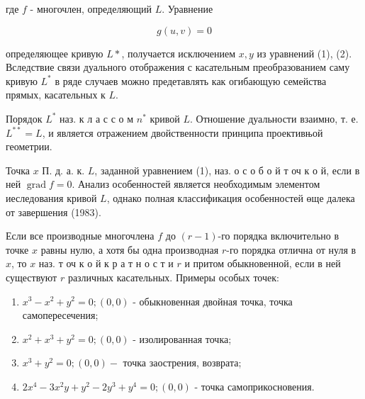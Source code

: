 \documentclass[10pt]{article}
\begin{document}
где $f$ - многочлен, определяющий $L$. Уравнение



\[

g(u, v)=0

\]



определяющее кривую $L *$, получается исключением $x, y$ из уравнений (1), (2). Вследствие связи дуального отображения с касательным преобразованием саму кривую $L^{*}$ в ряде случаев можно предетавлять как огибающую семейства прямых, касательных к $L$.



Порядок $L^{*}$ наз. к л а с с о м $n^{*}$ кривой $L$. Отношение дуальности взаимно, т. е. $L^{* *}=L$, и является отражением двойственности принципа проективњой геометрии.



Точка $x$ П. д. а. к. $L$, заданной уравнением (1), наз. о с о б о й т оч к о й, если в ней $\operatorname{grad} f=0$. Анализ особенностей является необходимым элементом иеследования кривой $L$, однако полная классификация особенностей өще далека от завершения (1983).



Если все производные многочлена $f$ до $(r-1)$-го порядка включительно в точке $x$ равны нулю, а хотя бы одна производная $r$-го порядка отлична от нуля в $x$, то $x$ наз. т оч к о й к р а т н о с т и $r$ и притом обыкновенной, если в ней существуют $r$ различных касательных. Примеры особых точек:



\begin{enumerate}

  \item $x^{3}-x^{2}+y^{2}=0 ;(0,0)$ - обыкновенная двойная точка, точка самопересечения;



  \item $x^{2}+x^{3}+y^{2}=0 ;(0,0)$ - изолированная точка;



  \item $x^{3}+y^{2}=0 ;(0,0)-$ точка заострения, возврата;



  \item $2 x^{4}-3 x^{2} y+y^{2}-2 y^{3}+y^{4}=0 ;(0,0)$ - точка самоприкосновения.



\end{enumerate}
\end{document}
